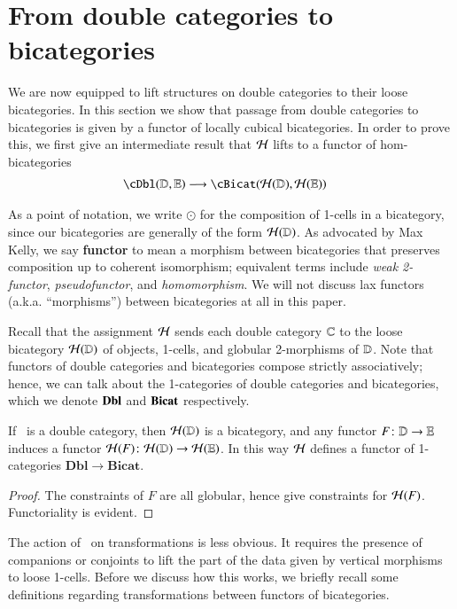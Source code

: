 \section{From double categories to bicategories}
\label{sec:1x1-to-bicat}

We are now equipped to lift structures on double categories to
their loose bicategories.  In this section we show that passage
from double categories to bicategories is given by a functor of locally cubical bicategories. In order to prove this, we first give an intermediate result that $\mathcal{H}$ lifts to a functor of hom-bicategories
\begin{align}
    \cDbl(\lD,\lE) &\too \cBicat(\cH(\lD),\cH(\lE))
\end{align}

As a point of notation, we write $\odot$ for the composition of
1-cells in a bicategory, since our bicategories are generally of the
form $\mathcal{H}(\mathbb{D})$.  As advocated by Max Kelly, we say \textbf{functor}
to mean a morphism between bicategories that preserves composition up
to coherent isomorphism; equivalent terms include \emph{weak 2-functor},
\emph{pseudofunctor}, and \emph{homomorphism}.
We will not discuss lax functors (a.k.a. ``morphisms'') between bicategories at all in this paper.

Recall that the assignment $\mathcal{H}$ sends each double category $\mathbb{C}$ to the loose bicategory  $\mathcal{H}(\mathbb{D})$ of objects, 1-cells, and globular 2-morphisms of $\mathbb{D}$.  Note that functors of double categories and bicategories compose strictly associatively; hence, we can talk about the 1-categories of double categories and bicategories, which we denote ${\bf Dbl}$ and ${\bf Bicat}$ respectively.

\begin{thm}\label{thm:1-func}
 If \lD\ is a double category, then $\mathcal{H}(\mathbb{D})$ is a bicategory, and
  any functor $F\colon \mathbb{D}\to\mathbb{E}$ induces a functor $\mathcal{H}(F)\colon
  \mathcal{H}(\mathbb{D})\to\mathcal{H}(\mathbb{E})$.  In this way $\mathcal{H}$ defines a functor of
  1-categories $\mathbf{Dbl}\to \mathbf{Bicat}$.
\end{thm}
\begin{proof}
 The constraints of $F$ are all globular, hence give constraints for
  $\mathcal{H}(F)$.  Functoriality is evident.
\end{proof}

The action of \cH\ on transformations is less obvious. It
requires the presence of companions or conjoints to lift the part of the data given by vertical morphisms to loose 1-cells. Before we discuss how this works, we briefly recall some definitions regarding transformations between functors of bicategories.

